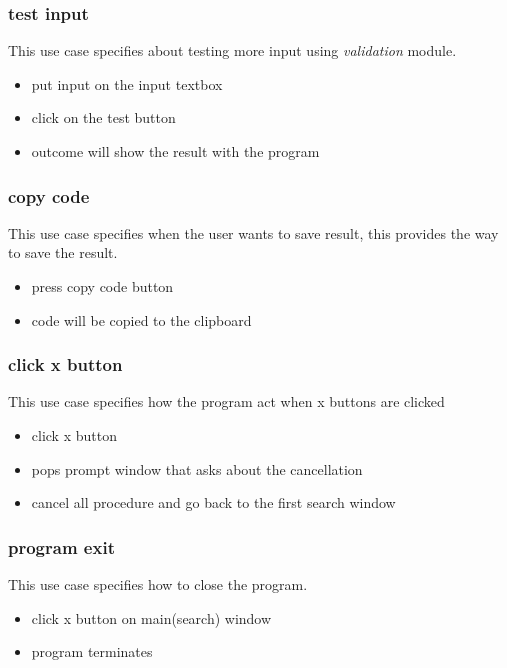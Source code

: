 \documentclass[conference]{IEEEtran}
\begin{document}
\subsubsection{test input}
This use case specifies about testing more input using \textit{validation} module.
\begin{itemize}
  \item put input on the input textbox
  \item click on the test button
  \item outcome will show the result with the program
\end{itemize}
\textit{}



\subsubsection{copy code}
This use case specifies when the user wants to save result, this provides the way to save the result.
\begin{itemize}
  \item press copy code button
  \item code will be copied to the clipboard
\end{itemize}
\textit{}



\subsubsection{click x button}
This use case specifies how the program act when x buttons are clicked
\begin{itemize}
  \item click x button
  \item pops prompt window that asks about the cancellation
  \item cancel all procedure and go back to the first search window
\end{itemize}
\textit{}



\subsubsection{program exit}
This use case specifies how to close the program.
\begin{itemize}
  \item click x button on main(search) window
  \item program terminates
\end{itemize}
\textit{}
\end{document}

